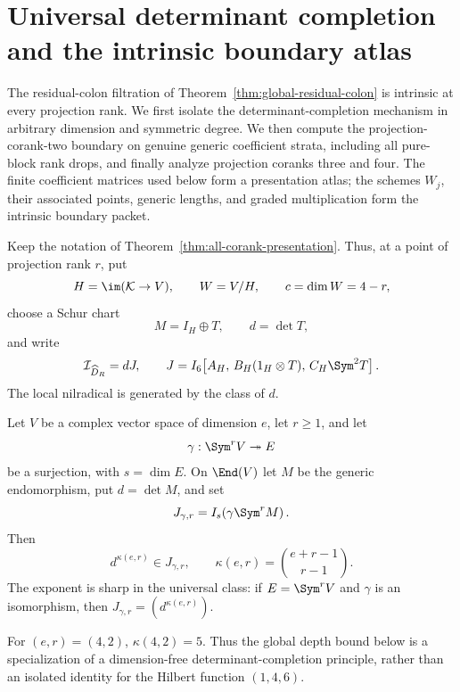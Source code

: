 \section{Universal determinant completion and the intrinsic boundary atlas}
\label{sec:boundary-atlas-statement}

The residual-colon filtration of
Theorem~\ref{thm:global-residual-colon} is intrinsic at every
projection rank.  We first isolate the determinant-completion
mechanism in arbitrary dimension and symmetric degree.  We then
compute the projection-corank-two boundary on genuine generic
coefficient strata, including all pure-block rank drops, and finally
analyze projection coranks three and four.  The finite coefficient
matrices used below form a presentation atlas; the schemes \(W_j\),
their associated points, generic lengths, and graded multiplication
form the intrinsic boundary packet.

Keep the notation of
Theorem~\ref{thm:all-corank-presentation}.  Thus, at a point of
projection rank \(r\), put
\[
 H=\im(\mathcal K\to V),\qquad W=V/H,\qquad c=\dim W=4-r,
\]
choose a Schur chart
\[
 M=I_H\oplus T,\qquad d=\det T,
\]
and write
\begin{equation}\label{eq:atlas-residual-J}
 \mathcal I_{\widehat D_R}=dJ,\qquad
 J=I_6\!\left[
 A_H,\,
 B_H(1_H\otimes T),\,
 C_H\Sym^2T
 \right].
\end{equation}
The local nilradical is generated by the class of \(d\).

\begin{theorem}
\label{thm:universal-det-completion}
Let \(V\) be a complex vector space of dimension \(e\), let
\(r\ge1\), and let
\[
 \gamma:\Sym^rV\twoheadrightarrow E
\]
be a surjection, with \(s=\dim E\).  On \(\End(V)\) let \(M\)
be the generic endomorphism, put \(d=\det M\), and set
\[
 J_{\gamma,r}=I_s\!\left(\gamma\Sym^rM\right).
\]
Then
\begin{equation}\label{eq:universal-det-completion}
 d^{\kappa(e,r)}\in J_{\gamma,r},\qquad
 \kappa(e,r)=\binom{e+r-1}{r-1}.
\end{equation}
The exponent is sharp in the universal class: if
\(E=\Sym^rV\) and \(\gamma\) is an isomorphism, then
\(J_{\gamma,r}=(d^{\kappa(e,r)})\).
\end{theorem}

For \((e,r)=(4,2)\),
\(\kappa(4,2)=5\).  Thus the global depth bound below is a
specialization of a dimension-free determinant-completion principle,
rather than an isolated identity for the Hilbert function
\((1,4,6)\).

